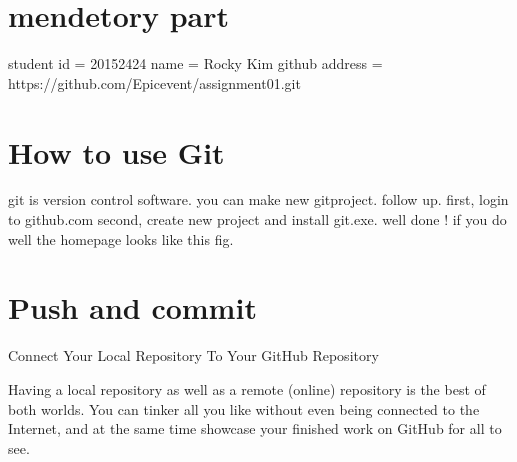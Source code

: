 \documentclass{article}
\begin{document}
\section {mendetory part}
student id = 20152424
name = Rocky Kim
github address = https://github.com/Epicevent/assignment01.git
\section{How to use Git}

git is version control software.
you can make new gitproject.
 follow up.
first, login to github.com
second, create new project and install git.exe.
well done ! if you do well
the homepage looks like this fig.

\section{Push and commit}
Connect Your Local Repository To Your GitHub Repository

Having a local repository as well as a remote (online) repository is the best of both worlds. You can tinker all you like without even being connected to the Internet, and at the same time showcase your finished work on GitHub for all to see.



%
%
\end{document}
